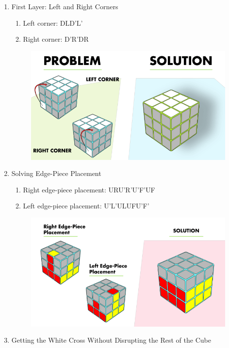 \documentclass[a4paper]{article}
\begin{document}
\begin{itemize}
\begin{enumerate}
\begin{figure}[!ht]
		\end{figure}
		\item First Layer: Left and Right Corners
		\begin{enumerate}
			\item Left corner: DLD'L'
			\item Right corner: D'R'DR
		\end{enumerate}
		\begin{figure}[!ht]
			\centering
			\includegraphics[scale=0.2]{1-2.png}
		\end{figure}
		\item Solving Edge-Piece Placement
		\begin{enumerate}
			\item Right edge-piece placement: URU'R'U'F'UF
			\item Left edge-piece placement: U'L'ULUFU'F'
		\end{enumerate}
		\begin{figure}[!ht]
			\centering
			\includegraphics[scale=0.2]{1-3.png}
		\end{figure}
		\newpage
		\item Getting the White Cross Without Disrupting the Rest of the Cube\par

\end{enumerate}
\end{itemize}
\end{document}
